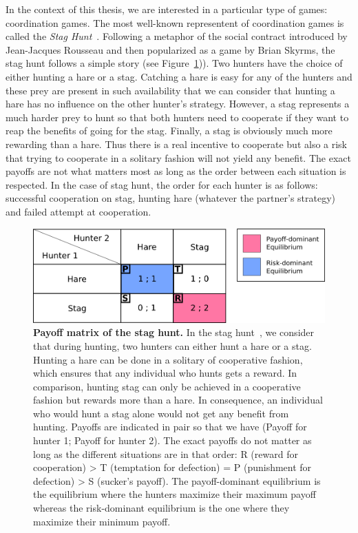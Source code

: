     In the context of this thesis, we are interested in a particular type of games: coordination games. The most well-known representent of coordination games is called the \emph{Stag Hunt}~\parencite{Skyrms2004}. Following a metaphor of the social contract introduced by Jean-Jacques Rousseau and then popularized as a game by Brian Skyrms, the stag hunt follows a simple story (see Figure~\ref{fig:MatrixStagHunt})). Two hunters have the choice of either hunting a hare or a stag. Catching a hare is easy for any of the hunters and these prey are present in such availability that we can consider that hunting a hare has no influence on the other hunter's strategy. However, a stag represents a much harder prey to hunt so that both hunters need to cooperate if they want to reap the benefits of going for the stag. Finally, a stag is obviously much more rewarding than a hare. Thus there is a real incentive to cooperate but also a risk that trying to cooperate in a solitary fashion will not yield any benefit. The exact payoffs are not what matters most as long as the order between each situation is respected. In the case of stag hunt, the order for each hunter is as follows: successful cooperation on stag, hunting hare (whatever the partner's strategy) and failed attempt at cooperation.

    \begin{figure}[hbt]
        \begin{center}
          \includegraphics[scale = 0.50]{fig/Intro/StagHunt.png}
          \caption{\textbf{Payoff matrix of the stag hunt.} 
          In the stag hunt~\parencite{Skyrms2004}, we consider that during hunting, two hunters can either hunt a hare or a stag. Hunting a hare can be done in a solitary of cooperative fashion, which ensures that any individual who hunts gets a reward. In comparison, hunting stag can only be achieved in a cooperative fashion but rewards more than a hare. In consequence, an individual who would hunt a stag alone would not get any benefit from hunting. Payoffs are indicated in pair so that we have (Payoff for hunter 1; Payoff for hunter 2). The exact payoffs do not matter as long as the different situations are in that order: R (reward for cooperation) > T (temptation for defection) = P (punishment for defection) > S (sucker's payoff). The payoff-dominant equilibrium is the equilibrium where the hunters maximize their maximum payoff whereas the risk-dominant equilibrium is the one where they maximize their minimum payoff.} 
          \label{fig:MatrixStagHunt}
        \end{center}
    \end{figure}

